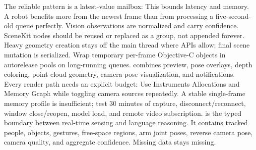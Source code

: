 {}The reliable pattern is a latest-value mailbox:\markdownRendererInterblockSeparator
{}\markdownRendererInterblockSeparator
{}This bounds latency and memory. A robot benefits more from the newest frame than from processing a five-second-old queue perfectly.\markdownRendererParagraphSeparator
{}Vision observations are normalized and carry confidence. SceneKit nodes should be reused or replaced as a group, not appended forever. Heavy geometry creation stays off the main thread where APIs allow; final scene mutation is serialized. Wrap temporary per-frame Objective-C objects in autorelease pools on long-running queues.\markdownRendererInterblockSeparator
{}
\markdownRendererSectionEnd \markdownRendererSectionBegin
{}\markdownRendererInterblockSeparator
{} combines preview, pose overlays, depth coloring, point-cloud geometry, camera-pose visualization, and notifications. Every render path needs an explicit budget:\markdownRendererInterblockSeparator
{}\markdownRendererInterblockSeparator
{}Use Instruments Allocations and Memory Graph while toggling camera sources repeatedly. A stable single-frame memory profile is insufficient; test 30 minutes of capture, disconnect/reconnect, window close/reopen, model load, and remote video subscription.\markdownRendererInterblockSeparator
{}
\markdownRendererSectionEnd \markdownRendererSectionBegin
{}\markdownRendererInterblockSeparator
{} is the typed boundary between real-time sensing and language reasoning. It contains tracked people, objects, gestures, free-space regions, arm joint poses, reverse camera pose, camera quality, and aggregate confidence. Missing data stays missing.\markdownRendererParagraphSeparator
